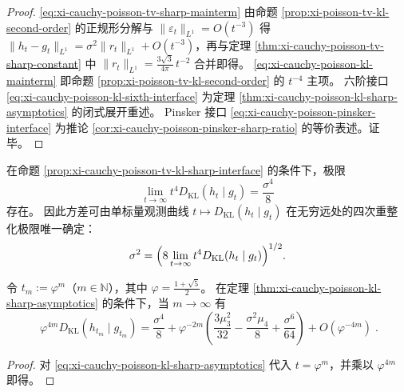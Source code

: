 \begin{proof}
\eqref{eq:xi-cauchy-poisson-tv-sharp-mainterm} 由命题 \ref{prop:xi-poisson-tv-kl-second-order} 的正规形分解与 \(\|\varepsilon_t\|_{L^1}=O(t^{-3})\) 得
\(
\|h_t-g_t\|_{L^1}=\sigma^2\|r_t\|_{L^1}+O(t^{-3})
\)，再与定理 \ref{thm:xi-cauchy-poisson-tv-sharp-constant} 中 \(\|r_t\|_{L^1}=\frac{3\sqrt3}{4\pi}\,t^{-2}\) 合并即得。
\eqref{eq:xi-cauchy-poisson-kl-mainterm} 即命题 \ref{prop:xi-poisson-tv-kl-second-order} 的 \(t^{-4}\) 主项。
六阶接口 \eqref{eq:xi-cauchy-poisson-kl-sixth-interface} 为定理 \ref{thm:xi-cauchy-poisson-kl-sharp-asymptotics} 的闭式展开重述。
Pinsker 接口 \eqref{eq:xi-cauchy-poisson-pinsker-interface} 为推论 \ref{cor:xi-cauchy-poisson-pinsker-sharp-ratio} 的等价表述。证毕。
\end{proof}

\begin{corollary}[四次重整化极限的方差可识别性]\label{cor:xi-cauchy-poisson-kl-variance-readout}
在命题 \ref{prop:xi-cauchy-poisson-tv-kl-sharp-interface} 的条件下，极限
\[
\lim_{t\to\infty} t^4 D_{\mathrm{KL}}(h_t\mid g_t)=\frac{\sigma^4}{8}
\]
存在。
因此方差可由单标量观测曲线 \(t\mapsto D_{\mathrm{KL}}(h_t\mid g_t)\) 在无穷远处的四次重整化极限唯一确定：
\[
\sigma^2=\Bigl(8\lim_{t\to\infty} t^4 D_{\mathrm{KL}}(h_t\mid g_t)\Bigr)^{1/2}.
\]
\end{corollary}

\begin{corollary}[黄金比尺度链上的四次重整化展开]\label{cor:xi-cauchy-poisson-kl-golden-scale}
令 \(t_m:=\varphi^m\)（\(m\in\mathbb N\)），其中 \(\varphi=\frac{1+\sqrt5}{2}\)。
在定理 \ref{thm:xi-cauchy-poisson-kl-sharp-asymptotics} 的条件下，当 \(m\to\infty\) 有
\begin{equation}\label{eq:xi-cauchy-poisson-kl-golden-scale}
\boxed{\;
\varphi^{4m}D_{\mathrm{KL}}(h_{t_m}\mid g_{t_m})
=\frac{\sigma^4}{8}
+\varphi^{-2m}\left(
\frac{3\mu_3^2}{32}-\frac{\sigma^2\mu_4}{8}+\frac{\sigma^6}{64}
\right)
+O(\varphi^{-4m})\; }.
\end{equation}
\end{corollary}
\begin{proof}
对 \eqref{eq:xi-cauchy-poisson-kl-sharp-asymptotics} 代入 \(t=\varphi^m\)，并乘以 \(\varphi^{4m}\) 即得。
\end{proof}

